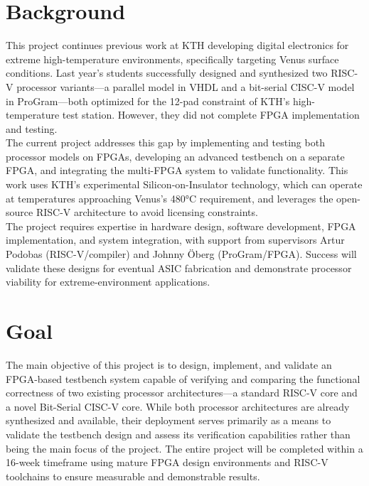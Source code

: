 \documentclass[10pt]{article}
\begin{document}
\clearpage
\tableofcontents
\thispagestyle{plain}
\clearpage

\section{Background}
This project continues previous work at KTH developing digital electronics for extreme high-temperature environments, specifically targeting Venus surface conditions. Last year's students successfully designed and synthesized two RISC-V processor variants—a parallel model in VHDL and a bit-serial CISC-V model in ProGram—both optimized for the 12-pad constraint of KTH's high-temperature test station. However, they did not complete FPGA implementation and testing.\\
The current project addresses this gap by implementing and testing both processor models on FPGAs, developing an advanced testbench on a separate FPGA, and integrating the multi-FPGA system to validate functionality. This work uses KTH's experimental Silicon-on-Insulator technology, which can operate at temperatures approaching Venus's 480°C requirement, and leverages the open-source RISC-V architecture to avoid licensing constraints.\\
The project requires expertise in hardware design, software development, FPGA implementation, and system integration, with support from supervisors Artur Podobas (RISC-V/compiler) and Johnny Öberg (ProGram/FPGA). Success will validate these designs for eventual ASIC fabrication and demonstrate processor viability for extreme-environment applications.

\section{Goal}

The main objective of this project is to design, implement, and validate an FPGA-based testbench system capable of verifying and comparing the functional correctness of two existing processor architectures—a standard RISC-V core and a novel Bit-Serial CISC-V core.  
While both processor architectures are already synthesized and available, their deployment serves primarily as a means to validate the testbench design and assess its verification capabilities rather than being the main focus of the project.  
The entire project will be completed within a 16-week timeframe using mature FPGA design environments and RISC-V toolchains to ensure measurable and demonstrable results.
\end{document}
